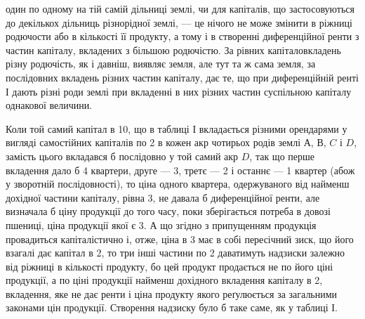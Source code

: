 \parcont{}  %
один по одному на тій самій дільниці землі, чи для капіталів, що застосовуються
до декількох дільниць різнорідної землі, — це нічого не може змінити в ріжниці
родючости або в кількості її продукту, а тому і в створенні диференційної
ренти з частин капіталу, вкладених з більшою родючістю. За рівних капіталовкладень
різну родючість, як і давніш, виявляє земля, але тут та ж сама земля,
за послідовних вкладень різних частин капіталу, дає те, що при диференційній
ренті І дають різні роди землі при вкладенні в них різних частин суспільною
капіталу однакової величини.

Коли той самий капітал в 10, що в таблиці І вкладається різними орендарями
у вигляді самостійних капіталів по 2 в кожен акр чотирьох родів
землі $А$, $В$, $C$ і $D$, замість цього вкладався б послідовно у той самий акр
$D$, так що перше вкладення дало б 4 квартери, друге — 3, третє — 2 і останнє
— 1 квартер (абож у зворотній послідовності), то ціна одного квартера, одержуваного
від найменш дохідної частини капіталу, рівна 3, не давала б диференційної
ренти, але визначала б ціну продукції до того часу, поки зберігається
потреба в довозі пшениці, ціна продукції якої є 3. А що згідно з припущенням
продукція провадиться капіталістично і, отже, ціна в 3 має
в собі пересічний зиск, що його взагалі дає капітал в 2, то три інші
частини по 2 даватимуть надзиски залежно від ріжниці в кількості
продукту, бо цей продукт продається не по його ціні продукції, а по ціні продукції
найменш дохідного вкладення капіталу в 2, вкладення, яке не дає ренти
і ціна продукту якого реґулюється за загальними законами цін продукції. Створення
надзиску було б таке саме, як у таблиці І.


